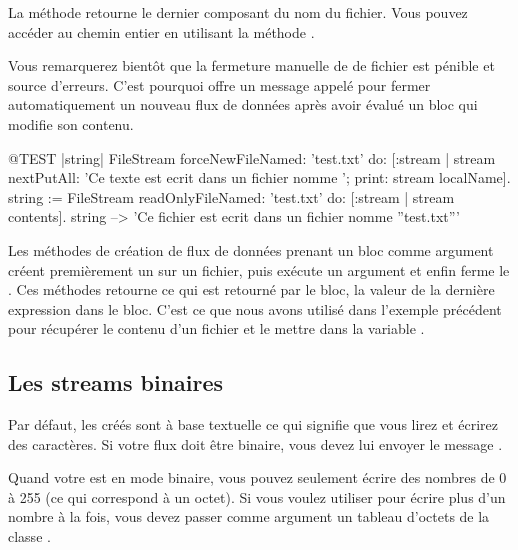 \documentclass[a4paper,10pt,twoside]{book}
\begin{document}


La m\'ethode  retourne le dernier composant du nom du fichier. Vous pouvez acc\'eder au chemin entier en utilisant la m\'ethode
.

Vous remarquerez bient\^ot que la fermeture manuelle de \stream de fichier
est p\'enible et source d'erreurs. C'est pourquoi 
offre un message appel\'e  
pour fermer automatiquement un nouveau flux de donn\'ees apr\`es
avoir \'evalu\'e un bloc qui modifie son contenu.

\begin{code}{@TEST |string|}
FileStream
    forceNewFileNamed: 'test.txt'
    do: [:stream |
        stream
            nextPutAll: 'Ce texte est ecrit dans un fichier nomme ';
            print: stream localName].
string := FileStream
            readOnlyFileNamed: 'test.txt'
            do: [:stream | stream contents].
string --> 'Ce fichier est ecrit dans un fichier nomme ''test.txt'''
\end{code}

Les m\'ethodes de cr\'eation de flux de donn\'ees prenant un bloc comme
argument cr\'eent premi\`erement un \stream sur un fichier, puis ex\'ecute
un argument et enfin ferme le \stream. Ces m\'ethodes retourne
ce qui est retourn\'e par le bloc, \ie la valeur de la derni\`ere
expression dans le bloc. C'est ce que nous avons utilis\'e dans
l'exemple pr\'ec\'edent pour r\'ecup\'erer le contenu d'un fichier
et le mettre dans la variable .

\subsection{Les streams binaires}
\label{sec:binary-streams}

Par d\'efaut, les \streams cr\'e\'es sont \`a base textuelle ce qui signifie
que vous lirez et \'ecrirez des caract\`eres.
Si votre flux doit \^etre binaire, vous devez lui envoyer le message 
.

Quand votre \stream est en mode binaire, vous pouvez seulement \'ecrire
des nombres de 0 \`a 255 (ce qui correspond \`a un octet). Si
vous voulez utiliser  pour \'ecrire plus d'un
nombre \`a la fois, vous devez passer comme
argument un tableau d'octets de la classe .
\end{document}
